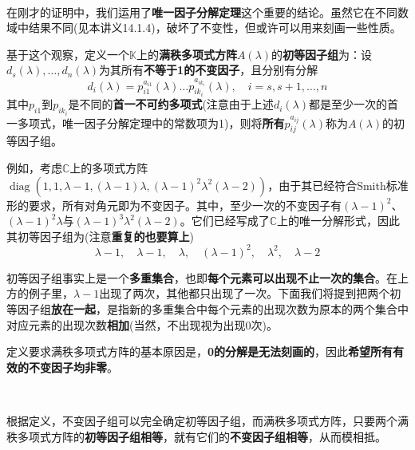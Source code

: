 \documentclass[a4paper,UTF8,fontset=windows,AutoFakeBold]{ctexart}
\DeclareMathOperator{\diag}{diag}
\newcommand*{\note}{\noindent *}
\begin{document}
\

在刚才的证明中，我们运用了\textbf{唯一因子分解定理}这个重要的结论。虽然它在不同数域中结果不同(见本讲义14.1.4)，破坏了不变性，但或许可以用来刻画一些性质。

基于这个观察，定义一个$\mathbb{K}$上的\textbf{满秩多项式方阵}$A(\lambda)$的\textbf{初等因子组}为：设$d_s(\lambda),\dots,d_n(\lambda)$为其所有\textbf{不等于1的不变因子}，且分别有分解
$$d_i(\lambda)=p_{i1}^{a_{i1}}(\lambda)\dots p_{ik_i}^{a_{ik_i}}(\lambda),\quad i=s,s+1,\dots,n$$
其中$p_{i1}$到$p_{ik_i}$是不同的\textbf{首一不可约多项式}(注意由于上述$d_i(\lambda)$都是至少一次的首一多项式，唯一因子分解定理中的常数项为1)，则将\textbf{所有}$p_{ij}^{a_{ij}}(\lambda)$称为$A(\lambda)$的初等因子组。

例如，考虑$\mathbb{C}$上的多项式方阵$\diag(1,1,\lambda-1,(\lambda-1)\lambda,(\lambda-1)^2\lambda^2(\lambda-2))$，由于其已经符合Smith标准形的要求，所有对角元即为不变因子。其中，至少一次的不变因子有$(\lambda-1)^2$、$(\lambda-1)^2\lambda$与$(\lambda-1)^3\lambda^2(\lambda-2)$。它们已经写成了$\mathbb{C}$上的唯一分解形式，因此其初等因子组为(注意\textbf{重复的也要算上})
$$\lambda-1,\quad\lambda-1,\quad\lambda,\quad(\lambda-1)^2,\quad\lambda^2,\quad\lambda-2$$

\note 初等因子组事实上是一个\textbf{多重集合}，也即\textbf{每个元素可以出现不止一次的集合}。在上方的例子里，$\lambda-1$出现了两次，其他都只出现了一次。下面我们将提到把两个初等因子组\textbf{放在一起}，是指新的多重集合中每个元素的出现次数为原本的两个集合中对应元素的出现次数\textbf{相加}(当然，不出现视为出现0次)。

\note 定义要求满秩多项式方阵的基本原因是，\textbf{0的分解是无法刻画的}，因此\textbf{希望所有有效的不变因子均非零}。

\


根据定义，不变因子组可以完全确定初等因子组，而满秩多项式方阵，只要两个满秩多项式方阵的\textbf{初等因子组相等}，就有它们的\textbf{不变因子组相等}，从而模相抵。
\end{document}
